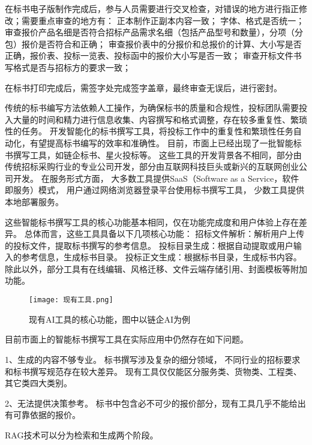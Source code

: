 \documentclass{xmu}
\begin{document}
在标书电子版制作完成后，参与人员需要进行交叉检查，对错误的地方进行指正修改；需要重点审查的地方有：
正本制作正副本内容一致；
字体、格式是否统一；
审查报价产品名细是否符合招标产品需求名细（包括产品型号和数量），分项（分包）报价是否符合和正确；
审查报价表中的分报价和总报价的计算、大小写是否正确，报价表、投标一览表、投标函中的报价大小写是否一致；
审查开标文件书写格式是否与招标方的要求一致；

在标书打印完成后，需签字处完成签字盖章，最终审查无误后，进行密封。

传统的标书编写方法依赖人工操作，为确保标书的质量和合规性，投标团队需要投入大量的时间和精力进行信息收集、内容撰写和格式调整，存在较多重复性、繁琐性的任务。
开发智能化的标书撰写工具，将投标工作中的重复性和繁琐性任务自动化，有望提高标书编写的效率和准确性。
目前，市面上已经出现了一批智能标书撰写工具，如链企标书、星火投标等。
这些工具的开发背景各不相同，部分由传统招标采购行业的专业公司开发，部分由互联网科技巨头或新兴的互联网创业公司开发。
在服务形式方面，
大多数工具提供SaaS（Software as a Service，软件即服务）模式，
用户通过网络浏览器登录平台使用标书撰写工具，
少数工具提供本地部署服务。

这些智能标书撰写工具的核心功能基本相同，仅在功能完成度和用户体验上存在差异。
总体而言，这些工具具备以下几项核心功能：
招标文件解析：解析用户上传的投标文件，提取标书撰写的参考信息。
投标目录生成：根据自动提取或用户输入的参考信息，生成标书目录。
投标正文生成：根据标书目录，生成标书内容。
除此以外，部分工具有在线编辑、风格迁移、文件云端存储引用、封面模板等附加功能。

\begin{figure}[!htb]
    \centering
    \texttt{[image: 现有工具.png]}\\
    \caption{现有AI工具的核心功能，图中以链企AI为例}\label{xmulogo}
\end{figure}

目前市面上的智能标书撰写工具在实际应用中仍然存在如下问题。

1、生成的内容不够专业。
标书撰写涉及复杂的细分领域，
不同行业的招标要求和标书撰写规范存在较大差异。
现有工具仅仅能区分服务类、货物类、工程类、其它类四大类别。

2、无法提供决策参考。
标书中包含必不可少的报价部分，现有工具几乎不能给出有可靠依据的报价。

RAG技术可以分为检索和生成两个阶段。
\end{document}
